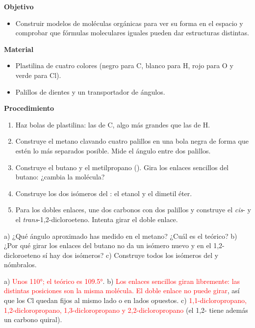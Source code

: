\noindent\begin{minipage}[t]{0.48\textwidth}
    \textbf{Objetivo}
    \begin{itemize}
        \item Construir modelos de moléculas orgánicas para ver su forma en el espacio y comprobar que fórmulas moleculares iguales
        pueden dar estructuras distintas.
    \end{itemize}
\end{minipage}\hfill
\begin{minipage}[t]{0.48\textwidth}
    \textbf{Material}
    \begin{itemize}
        \item Plastilina de cuatro colores (negro para C, blanco para H, rojo para O y verde para Cl).
        \item Palillos de dientes y un transportador de ángulos.
    \end{itemize}
\end{minipage}

\textbf{Procedimiento}
\begin{enumerate}[label=\numberballgreen]
    \item Haz bolas de plastilina: las de C, algo más grandes que las de H.
    \item Construye el metano clavando cuatro palillos en una bola negra de forma que estén lo más separados posible. Mide el ángulo
    entre dos palillos.
    \item Construye el butano y el metilpropano (). Gira los enlaces sencillos del butano: ¿cambia la molécula?
    \item Construye los dos isómeros del : el etanol y el dimetil éter.
    \item Para los dobles enlaces, une dos carbonos con dos palillos y construye el \emph{cis}- y el
    \emph{trans}-1,2-dicloroeteno. Intenta girar el doble enlace.
\end{enumerate}

\begin{exercise}
    a) ¿Qué ángulo aproximado has medido en el metano? ¿Cuál es el teórico? b) ¿Por qué girar los enlaces del butano no da un
    isómero nuevo y en el 1,2-dicloroeteno sí hay dos isómeros? c) Construye todos los isómeros del  y nómbralos.
    \begin{solu}
        a) \textcolor{red}{Unos \ang{110}; el teórico es \ang{109.5}}. b) \textcolor{red}{Los enlaces sencillos giran libremente:
        las distintas posiciones son la misma molécula. El doble enlace no puede girar}, así que los Cl quedan fijos al mismo lado o
        en lados opuestos. c) \textcolor{red}{1,1-dicloropropano, 1,2-dicloropropano, 1,3-dicloropropano y 2,2-dicloropropano}
        (el 1,2- tiene además un carbono quiral).
    \end{solu}
\end{exercise}

